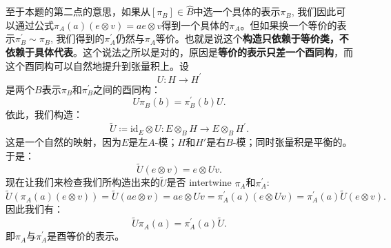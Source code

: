 至于本题的第二点的意思，如果从$[\pi_B]\in\hat{B}$中选一个具体的表示$\pi_B$, 我们因此可以通过公式$\pi_A(a)(e\otimes v)=ae\otimes v$得到一个具体的$\pi_A$。但如果换一个等价的表示$\pi_B^{\prime}\sim \pi_B$, 我们得到的$\pi_A^{\prime}$仍然与$\pi_A$等价。也就是说这个\textbf{构造只依赖于等价类，不依赖于具体代表}。这个说法之所以是对的，原因是\textbf{等价的表示只差一个酉同构}，而这个酉同构可以自然地提升到张量积上。设
\[
U:H\rightarrow H^{\prime}
\]
是两个$B$表示$\pi_B$和$\pi_B^{\prime}$之间的酉同构：
\[U\pi_B(b)=\pi_B^{\prime}(b)U.\]
依此，我们构造：
\[\tilde{U}\coloneq\text{id}_E\otimes U: E\otimes_BH\rightarrow E\otimes_BH^{\prime}.\]
这是一个自然的映射，因为$E$是左$A$-模；$H$和$H\prime$是右$B$-模；同时张量积是平衡的。于是：
\[\tilde{U}(e\otimes v)=e\otimes Uv.\]
现在让我们来检查我们所构造出来的$\tilde{U}$是否 intertwine $\pi_A$和$\pi_A^{\prime}$:
\[\tilde{U}(\pi_A(a)(e\otimes v))=\tilde{U}(ae\otimes v)=ae\otimes Uv=\pi_A^{\prime}(a)(e\otimes Uv)=\pi^{\prime}_A(a)\tilde{U}(e\otimes v).\]
因此我们有：
\[\tilde{U}\pi_A(a)=\pi_A^{\prime}(a)\tilde{U}.\]
即$\pi_A$与$\pi_A^{\prime}$是酉等价的表示。

